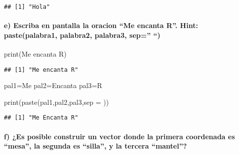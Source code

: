 \documentclass[
]{article}
\newenvironment{Shaded}{\begin{snugshade}}{\end{snugshade}}
\newcommand{\AttributeTok}[1]{\textcolor[rgb]{0.77,0.63,0.00}{#1}}
\newcommand{\FunctionTok}[1]{\textcolor[rgb]{0.00,0.00,0.00}{#1}}
\newcommand{\NormalTok}[1]{#1}
\newcommand{\OtherTok}[1]{\textcolor[rgb]{0.56,0.35,0.01}{#1}}
\newcommand{\StringTok}[1]{\textcolor[rgb]{0.31,0.60,0.02}{#1}}
\begin{document}
\begin{verbatim}
## [1] "Hola"
\end{verbatim}

\hypertarget{e-escriba-en-pantalla-la-oracion-me-encanta-r.-hint-pastepalabra1-palabra2-palabra3-sep}{%
\paragraph{e) Escriba en pantalla la oracion ``Me encanta R''. Hint:
paste(palabra1, palabra2, palabra3, sep=''
``)}\label{e-escriba-en-pantalla-la-oracion-me-encanta-r.-hint-pastepalabra1-palabra2-palabra3-sep}}

\begin{Shaded}
\begin{Highlighting}[]
\FunctionTok{print}\NormalTok{(}\StringTok{\textquotesingle{}Me encanta R\textquotesingle{}}\NormalTok{)}
\end{Highlighting}
\end{Shaded}

\begin{verbatim}
## [1] "Me encanta R"
\end{verbatim}

\begin{Shaded}
\begin{Highlighting}[]
\NormalTok{pal1}\OtherTok{=}\StringTok{\textquotesingle{}Me\textquotesingle{}}
\NormalTok{pal2}\OtherTok{=}\StringTok{\textquotesingle{}Encanta\textquotesingle{}}
\NormalTok{pal3}\OtherTok{=}\StringTok{\textquotesingle{}R\textquotesingle{}}

\FunctionTok{print}\NormalTok{(}\FunctionTok{paste}\NormalTok{(pal1,pal2,pal3,}\AttributeTok{sep =} \StringTok{\textquotesingle{} \textquotesingle{}}\NormalTok{))}
\end{Highlighting}
\end{Shaded}

\begin{verbatim}
## [1] "Me Encanta R"
\end{verbatim}

\hypertarget{f-es-posible-construir-un-vector-donde-la-primera-coordenada-es-mesa-la-segunda-es-silla-y-la-tercera-mantel}{%
\paragraph{f) ¿Es posible construir un vector donde la primera
coordenada es ``mesa'', la segunda es ``silla'', y la tercera
``mantel''?}\label{f-es-posible-construir-un-vector-donde-la-primera-coordenada-es-mesa-la-segunda-es-silla-y-la-tercera-mantel}}
\end{document}
